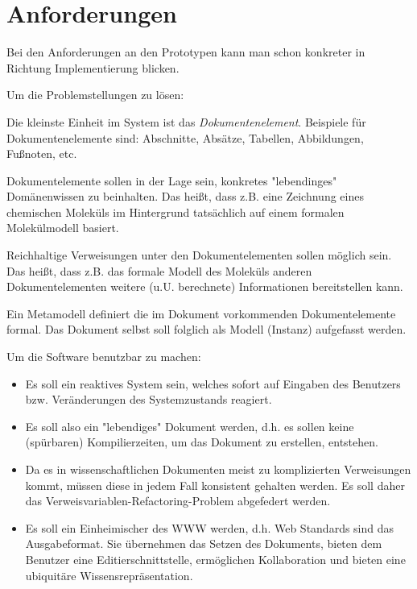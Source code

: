 \section{Anforderungen}

Bei den Anforderungen an den Prototypen kann man schon
konkreter in Richtung Implementierung blicken.

Um die Problemstellungen zu lösen:

Die kleinste Einheit im System ist das \emph{Dokumentenelement}.
Beispiele für Dokumentenelemente sind: Abschnitte, Absätze, Tabellen, Abbildungen, Fußnoten, etc.

Dokumentelemente sollen in der Lage sein, konkretes "lebendinges" Domänenwissen zu beinhalten.
Das heißt, dass z.B. eine Zeichnung eines chemischen Moleküls im Hintergrund tatsächlich
auf einem formalen Molekülmodell basiert.

Reichhaltige Verweisungen unter den Dokumentelementen sollen möglich sein.
Das heißt, dass z.B. das formale Modell des Moleküls
anderen Dokumentelementen weitere (u.U. berechnete) Informationen bereitstellen kann.

Ein Metamodell definiert die im Dokument vorkommenden Dokumentelemente formal.
Das Dokument selbst soll folglich als Modell (Instanz) aufgefasst werden.

Um die Software benutzbar zu machen:

\begin{itemize}
  \item Es soll ein reaktives System sein, welches sofort auf Eingaben des Benutzers bzw. Veränderungen des Systemzustands reagiert.
  \item Es soll also ein "lebendiges" Dokument werden, d.h. es sollen keine (spürbaren) Kompilierzeiten, um das Dokument zu erstellen, entstehen.
  \item Da es in wissenschaftlichen Dokumenten meist zu komplizierten Verweisungen kommt, müssen diese in jedem Fall konsistent gehalten werden. Es soll daher das Verweisvariablen-Refactoring-Problem abgefedert werden.
  \item Es soll ein Einheimischer des WWW werden, d.h. Web Standards sind das Ausgabeformat. Sie übernehmen das Setzen des Dokuments, bieten dem Benutzer eine Editierschnittstelle, ermöglichen Kollaboration und bieten eine ubiquitäre Wissensrepräsentation.
\end{itemize}

